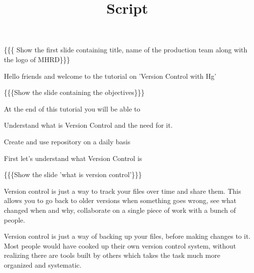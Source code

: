 \documentclass[a4paper,english]{article}
\begin{document}
\title{Script%
  \label{script}}
\author{}
\date{}
\maketitle






\{\{\{ Show the first slide containing title, name of the production team along with the logo of MHRD\}\}\}


Hello friends and welcome to the tutorial on 'Version Control with Hg'


\{\{\{Show the slide containing the objectives\}\}\}


At the end of this tutorial you will be able to
\begin{list}{.}
{
\setlength{\rightmargin}{\leftmargin}
}

\item Understand what is Version Control and the need for it.

\item Create and use repository on a daily basis
\end{list}


First let's understand what Version Control is


\{\{\{Show the slide 'what is version control'\}\}\}


Version control is just a way to track your files over time and share them. This allows you to go back to older versions when something goes wrong, see what changed when and why, collaborate on a single piece of work with a bunch of people.

Version control is just a way of backing up your files, before making changes to it. Most people would have cooked up their own version control system, without realizing there are tools built by others which takes the task much more organized and systematic.

\end{document}
